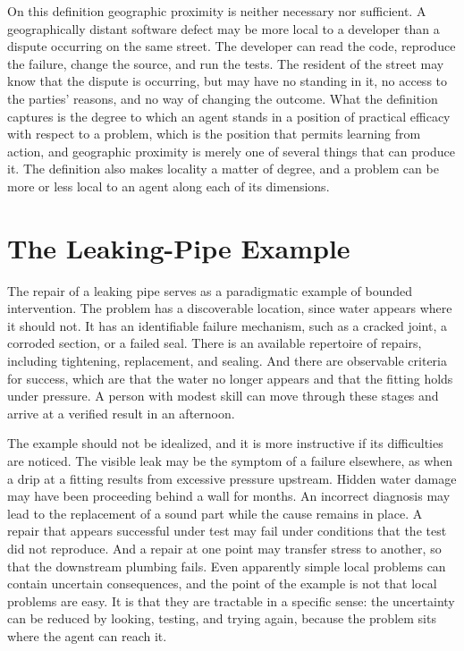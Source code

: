 \documentclass[11pt]{report}
\theoremstyle{definition}
\theoremstyle{remark}
\begin{document}
On this definition geographic proximity is neither necessary nor sufficient. A geographically distant software defect may be more local to a developer than a dispute occurring on the same street. The developer can read the code, reproduce the failure, change the source, and run the tests. The resident of the street may know that the dispute is occurring, but may have no standing in it, no access to the parties' reasons, and no way of changing the outcome. What the definition captures is the degree to which an agent stands in a position of practical efficacy with respect to a problem, which is the position that permits learning from action, and geographic proximity is merely one of several things that can produce it. The definition also makes locality a matter of degree, and a problem can be more or less local to an agent along each of its dimensions.

\section{The Leaking-Pipe Example}

The repair of a leaking pipe serves as a paradigmatic example of bounded intervention. The problem has a discoverable location, since water appears where it should not. It has an identifiable failure mechanism, such as a cracked joint, a corroded section, or a failed seal. There is an available repertoire of repairs, including tightening, replacement, and sealing. And there are observable criteria for success, which are that the water no longer appears and that the fitting holds under pressure. A person with modest skill can move through these stages and arrive at a verified result in an afternoon.

The example should not be idealized, and it is more instructive if its difficulties are noticed. The visible leak may be the symptom of a failure elsewhere, as when a drip at a fitting results from excessive pressure upstream. Hidden water damage may have been proceeding behind a wall for months. An incorrect diagnosis may lead to the replacement of a sound part while the cause remains in place. A repair that appears successful under test may fail under conditions that the test did not reproduce. And a repair at one point may transfer stress to another, so that the downstream plumbing fails. Even apparently simple local problems can contain uncertain consequences, and the point of the example is not that local problems are easy. It is that they are tractable in a specific sense: the uncertainty can be reduced by looking, testing, and trying again, because the problem sits where the agent can reach it.
\end{document}
